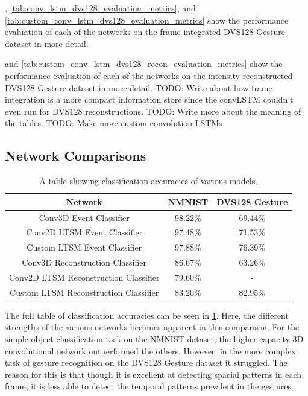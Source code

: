 , \cref{tab:conv_lstm_dvs128_evaluation_metrics}, and \cref{tab:custom_conv_lstm_dvs128_evaluation_metrics} show the performance evaluation of each of the networks on the frame-integrated DVS128 Gesture dataset in more detail.

 and \cref{tab:custom_conv_lstm_dvs128_recon_evaluation_metrics} show the performance evaluation of each of the networks on the intensity reconstructed DVS128 Gesture dataset in more detail. 
\color {red} TODO: Write about how frame integration is a more compact information store since the convLSTM couldn't even run for DVS128 reconstructions. \color{black}
\color{red} TODO: Write more about the meaning of the tables. \color{black}
\color{red} TODO: Make more custom convolution LSTMs \color{black}

\subsection{Network Comparisons}

\begin{table}[htb]
    \centering
    \begin{tabular}{|| c | c | c ||}
        \hline
        Network     & NMNIST & DVS128 Gesture \\
        \hline \hline
        Conv3D Event Classifier          & 98.22\%   &   69.44\%    \\
        \hline
        Conv2D LTSM Event Classifier         & 97.48\%   &    71.53\%    \\
        \hline
        Custom LTSM Event Classifier         & 97.88\%  &   76.39\%     \\
        \hline
        Conv3D Reconstruction Classifier           & 86.67\%    &   63.26\%    \\
        \hline
        Conv2D LTSM Reconstruction Classifier          & 79.60\%   &  -    \\
        \hline
        Custom LTSM Reconstruction Classifier         & 83.20\%  &   82.95\%   \\
        \hline
    \end{tabular}
    \caption{A table showing classification accuracies of various models.}
    \label{tab:network_performances}
\end{table}

The full table of classification accuracies can be seen in \cref{tab:network_performances}. Here, the different strengths of the various networks becomes apparent in this comparison. For the simple object classification task on the NMNIST dataset, the higher capacity 3D convolutional network outperformed the others. However, in the more complex task of gesture recognition on the DVS128 Gesture dataset it struggled. The reason for this is that though it is excellent at detecting spacial patterns in each frame, it is less able to detect the temporal patterns prevalent in the gestures.

